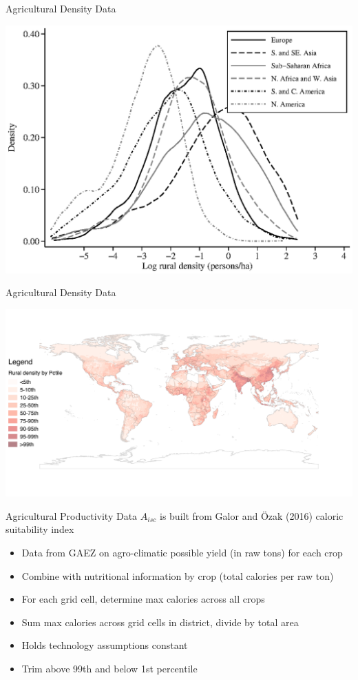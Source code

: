 \documentclass[10pt, xcolor=dvipsnames]{beamer}
\begin{document}
\begin{frame}{Agricultural Density Data}
\begin{center}
\includegraphics[width=.8\textwidth]{fig_dens_rurd.eps}
\end{center}
\end{frame}

\begin{frame}{Agricultural Density Data}
\begin{center}
\includegraphics[scale=.5]{fig_rurd_map.png}
\end{center}
\end{frame}

\begin{frame}{Agricultural Productivity Data}\label{data}
$A_{isc}$ is built from Galor and {\"O}zak (2016) caloric suitability index
\begin{itemize}
  \item Data from GAEZ on agro-climatic possible yield (in raw tons) for each crop
  \item Combine with nutritional information by crop (total calories per raw ton)
  \item For each grid cell, determine max calories across all crops
  \item Sum max calories across grid cells in district, divide by total area
  \item Holds technology assumptions constant
  \item Trim above 99th and below 1st percentile
\end{itemize}
\hfill \hyperlink{stats}{}

\hfill \hyperlink{crops}{}
\end{frame}
\end{document}
